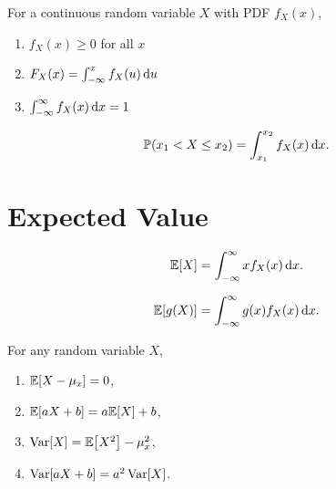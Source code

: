 \begin{theorem}
    For a continuous random variable $X$ with PDF $f_X(x)$,
    \begin{enumerate}
        \item $f_X(x)\geq 0$ for all $x$
        \item $F_X(x)=\int_{-\infty}^x f_X(u)\mathop{}\!\mathrm{d} u$
        \item $\int_{-\infty}^{\infty} f_X(x)\mathop{}\!\mathrm{d} x = 1$
    \end{enumerate}
\end{theorem}

\begin{theorem}
    \begin{align*}
        \P{x_1<X\leq x_2}=\int_{x_1}^{x_2}f_X(x)\diff x.
    \end{align*}
\end{theorem}


\section{Expected Value}
\begin{definition}
    \begin{align*}
        \E{X}=\int_{-\infty}^{\infty} xf_X(x) \diff x.
    \end{align*}
\end{definition}

\begin{theorem}
    \begin{align*}
        \E{g(X)} = \int_{-\infty}^{\infty} g(x)f_X(x)\diff x.
    \end{align*}
\end{theorem}

\begin{theorem}
    For any random variable $X$,
    \begin{enumerate}
        \item $\E{X-\mu_x}=0$,
        \item $\E{aX+b}=a\E{X}+b$,
        \item $\Var[X] = \E{X^2}-\mu_x^2$,
        \item $\mathop{\mathrm{Var}}\nolimits[aX+b]=a^2\mathop{\mathrm{Var}}\nolimits[X]$.
    \end{enumerate}
\end{theorem}

